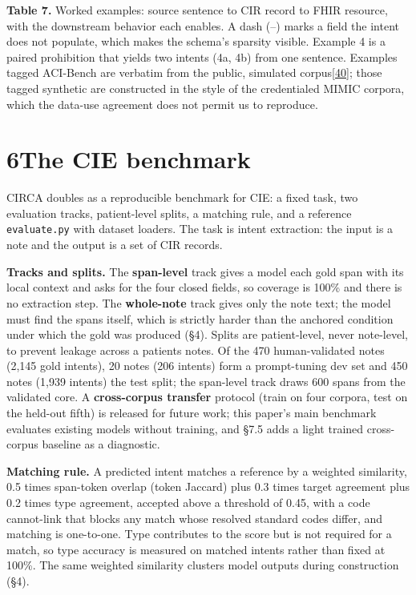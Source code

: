 \textbf{Table 7.} Worked examples: source sentence to CIR record to FHIR resource, with the downstream behavior each enables. A dash (--) marks a field the intent does not populate, which makes the schema's sparsity visible. Example 4 is a paired prohibition that yields two intents (4a, 4b) from one sentence. Examples tagged ACI-Bench are verbatim from the public, simulated corpus{[}\hyperref[r40]{40}{]}; those tagged synthetic are constructed in the style of the credentialed MIMIC corpora, which the data-use agreement does not permit us to reproduce.

\section{\texorpdfstring{{6}The CIE benchmark}{6The CIE benchmark}}\label{the-cie-benchmark}

CIRCA doubles as a reproducible benchmark for CIE: a fixed task, two evaluation tracks, patient-level splits, a matching rule, and a reference \texttt{evaluate.py} with dataset loaders. The task is intent extraction: the input is a note and the output is a set of CIR records.

\textbf{Tracks and splits.} The \textbf{span-level} track gives a model each gold span with its local context and asks for the four closed fields, so coverage is 100\% and there is no extraction step. The \textbf{whole-note} track gives only the note text; the model must find the spans itself, which is strictly harder than the anchored condition under which the gold was produced (§4). Splits are patient-level, never note-level, to prevent leakage across a patient\textquotesingle s notes. Of the 470 human-validated notes (2,145 gold intents), 20 notes (206 intents) form a prompt-tuning dev set and 450 notes (1,939 intents) the test split; the span-level track draws 600 spans from the validated core. A \textbf{cross-corpus transfer} protocol (train on four corpora, test on the held-out fifth) is released for future work; this paper's main benchmark evaluates existing models without training, and §7.5 adds a light trained cross-corpus baseline as a diagnostic.

\textbf{Matching rule.} A predicted intent matches a reference by a weighted similarity, 0.5 times span-token overlap (token Jaccard) plus 0.3 times target agreement plus 0.2 times type agreement, accepted above a threshold of 0.45, with a code cannot-link that blocks any match whose resolved standard codes differ, and matching is one-to-one. Type contributes to the score but is not required for a match, so type accuracy is measured on matched intents rather than fixed at 100\%. The same weighted similarity clusters model outputs during construction (§4).

